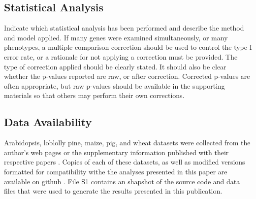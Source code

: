\documentclass[9pt,twocolumn,twoside]{g3_article/gsag3jnl}
\begin{document}
\subsection*{Statistical Analysis} 

Indicate which statistical analysis has been performed and describe the method and model applied. 
If many genes were examined simultaneously, or many phenotypes, a multiple comparison correction should be 
used to control the type I error rate, or a rationale for not applying a correction must be provided. 
The type of correction applied should be clearly stated. It should also be clear whether the p-values 
reported are raw, or after correction. Corrected p-values are often appropriate, but raw p-values 
should be available in the supporting materials so that others may perform their own corrections. 

\subsection*{Data Availability}

Arabidopsis, loblolly pine, maize, pig, and wheat datasets were collected from the author's web pages
or the supplementary information published with their respective papers \citep{loudet2002, resende2012, crossa2010, cleveland2012, thavamanikumar2015}.
Copies of each of these datasets, as well as modified versions formatted for compatibility withe the analyses
presented in this paper are available on github \citep{mcdowell2016}. File S1 contains an shapshot of the 
source code and data files that were used to generate the results presented in this publication.

%
\end{document}
